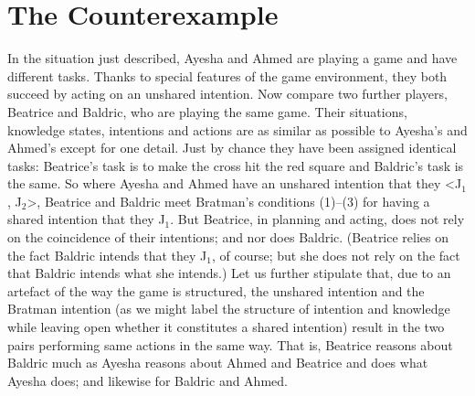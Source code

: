 \documentclass[12pt,\papersize]{extarticle}
\begin{document}
%



\section{The Counterexample}

In the situation just described,
Ayesha and Ahmed are playing a game and have different tasks.
Thanks to special features of the game environment, they both succeed by acting on an unshared intention.
Now compare two further players, Beatrice and Baldric, who are playing the same game. 
Their situations, knowledge states, intentions and actions are as similar as possible to Ayesha's and Ahmed's except for one detail.
Just by chance they have been assigned identical tasks: Beatrice's task is to make the cross hit the red square and Baldric's task is the same.
So where Ayesha and Ahmed have an unshared intention that they <J$_1$, J$_2$>,
Beatrice and Baldric meet Bratman's conditions (1)--(3) for having a shared intention that they J$_1$.  
But Beatrice, in planning and acting, does not rely on the coincidence of their intentions; and nor does Baldric.
(Beatrice relies on the fact Baldric intends that they J$_1$, of course; but she does not rely on the fact that Baldric intends what she intends.) 
Let us further stipulate that, due to an artefact of the way the game is structured,
the unshared intention and the 
	Bratman intention 
	\label{df:bratman_intention}
	(as we might label the structure of intention and knowledge 
	while leaving open whether it constitutes a shared intention) result in the two pairs performing same actions in the same way.
That is, Beatrice reasons about Baldric much as Ayesha reasons about Ahmed and Beatrice and does what Ayesha does; and likewise for Baldric and Ahmed. 
\end{document}
